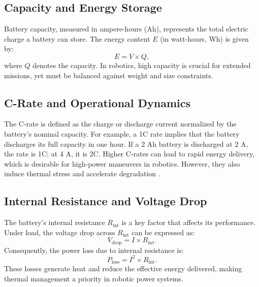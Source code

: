 \subsection{Capacity and Energy Storage}
Battery capacity, measured in ampere-hours (Ah), represents the total electric charge a battery can store. The energy content \(E\) (in watt-hours, Wh) is given by:
\begin{equation}
E = V \times Q,
\end{equation}
where \(Q\) denotes the capacity. In robotics, high capacity is crucial for extended missions, yet must be balanced against weight and size constraints.

\subsection{C-Rate and Operational Dynamics}
The C-rate is defined as the charge or discharge current normalized by the battery's nominal capacity. For example, a 1C rate implies that the battery discharges its full capacity in one hour. If a 2 Ah battery is discharged at 2 A, the rate is 1C; at 4 A, it is 2C. Higher C-rates can lead to rapid energy delivery, which is desirable for high-power maneuvers in robotics. However, they also induce thermal stress and accelerate degradation \cite{Rahman2024}.

\subsection{Internal Resistance and Voltage Drop}
The battery's internal resistance \(R_{\text{int}}\) is a key factor that affects its performance. Under load, the voltage drop across \(R_{\text{int}}\) can be expressed as:
\begin{equation}
V_{\text{drop}} = I \times R_{\text{int}}.
\end{equation}
Consequently, the power loss due to internal resistance is:
\begin{equation}
P_{\text{loss}} = I^2 \times R_{\text{int}}.
\end{equation}
These losses generate heat and reduce the effective energy delivered, making thermal management a priority in robotic power systems.

